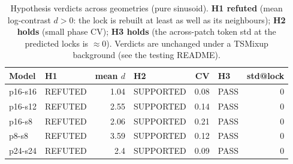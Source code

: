 \begin{table}[!ht]
  \centering
  \footnotesize
  \begin{tabular}{llrlrlr}
    \toprule
    Model & H1 & mean $d$ & H2 & CV & H3 & std@lock \\
    \midrule
    p16-s16 & REFUTED & 1.04 & SUPPORTED & 0.08 & PASS & 0 \\
    p16-s12 & REFUTED & 2.55 & SUPPORTED & 0.14 & PASS & 0 \\
    p16-s8 & REFUTED & 2.06 & SUPPORTED & 0.21 & PASS & 0 \\
    p8-s8 & REFUTED & 3.59 & SUPPORTED & 0.12 & PASS & 0 \\
    p24-s24 & REFUTED & 2.4 & SUPPORTED & 0.09 & PASS & 0 \\
    \bottomrule
  \end{tabular}
  \caption{Hypothesis verdicts across geometries (pure sinusoid). \textbf{H1 refuted} (mean log-contrast $d>0$: the lock is rebuilt at least as well as its neighbours); \textbf{H2 holds} (small phase CV); \textbf{H3 holds} (the across-patch token std at the predicted locks is $\approx 0$). Verdicts are unchanged under a TSMixup background (see the testing README).}
  \label{tab:verdicts}
\end{table}
